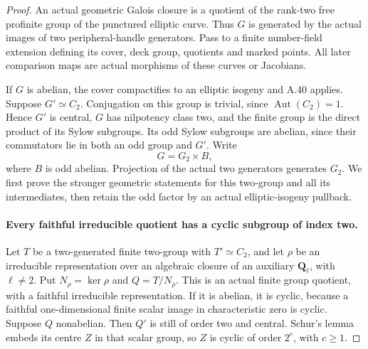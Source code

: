 \begin{proof}
An actual geometric Galois closure is a quotient of the
rank-two free profinite group of the punctured elliptic
curve. Thus \(G\) is generated by the actual images
of two peripheral-handle generators. Pass to a finite
number-field extension defining its cover, deck group,
quotients and marked points. All later comparison maps
are actual morphisms of these curves or Jacobians.

If \(G\) is abelian, the cover compactifies to an
elliptic isogeny and A.40 applies. Suppose \(G'\simeq C_2\).
Conjugation on this group is trivial, since
\(\operatorname{Aut}(C_2)=1\). Hence \(G'\) is central,
\(G\) has nilpotency class two, and the finite group
is the direct product of its Sylow subgroups. Its odd
Sylow subgroups are abelian, since their commutators
lie in both an odd group and \(G'\). Write
\[
                            G=G_2\times B,
                                                        \tag{A.77.2}
\]
where \(B\) is odd abelian. Projection of the actual
two generators generates \(G_2\). We first prove the
stronger geometric statements for this two-group and
all its intermediates, then retain the odd factor by
an actual elliptic-isogeny pullback.

\paragraph{Every faithful irreducible quotient has a cyclic subgroup of index two.}
Let \(T\) be a two-generated finite two-group with
\(T'\simeq C_2\), and let \(\rho\) be an irreducible representation over
an algebraic closure of an auxiliary \(\mathbf Q_\ell\),
with \(\ell\ne2\). Put \(N_\rho=\ker\rho\)
and \(Q=T/N_\rho\). This is an actual finite group
quotient, with a faithful irreducible representation.
If it is abelian, it is cyclic, because a faithful
one-dimensional finite scalar image in characteristic zero is cyclic.
Suppose \(Q\) nonabelian. Then \(Q'\) is still
of order two and central. Schur's lemma embeds its
centre \(Z\) in that scalar group, so \(Z\)
is cyclic of order \(2^c\), with \(c\ge1\).


\end{proof}
